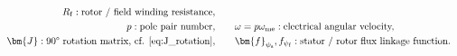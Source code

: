 \begin{frame}
{\begin{equation*}
\begin{aligned}
                    \qquad R_\mathrm{f} : \text{rotor / field winding resistance},                                                                                                                                                    \\
                    p                                           : \text{pole pair number},                                    &
                    \qquad \omega = p\omega_\mathrm{me}                   : \text{electrical angular velocity,}                                                                                                                       \\
                    \bm{J}: \text{90° rotation matrix, cf. \eqref{eq:J_rotation}},                                            & \qquad \bm{f}_{\psi_\mathrm{s}}, {f}_{\psi_\mathrm{f}} : \text{stator / rotor flux linkage function}.
                \end{aligned}
            \end{equation*}}
\end{frame}


